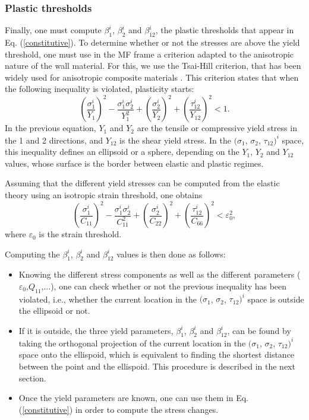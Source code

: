 \documentclass[]{article}
\begin{document}
\subsubsection{Plastic thresholds}
Finally, one must compute $\beta_1^i$, $\beta_2^i$ and $\beta_{12}^i$, the plastic thresholds that appear in Eq. (\ref{constitutive}).
To determine whether or not the stresses are above the yield threshold, one must use in the MF frame a criterion adapted to the anisotropic nature of the wall material. For this, we use the Tsai-Hill criterion, that has been widely used for anisotropic composite materials \citep{tsai65, fuc06, mor15}. This criterion states that when the following inequality is violated, plasticity starts:
\begin{equation}\label{tsai_hill}
	\left(\frac{\sigma_1^i}{Y_1}\right)^2 - \frac{\sigma_1^i \sigma_2^i}{Y_1^2} + \left(\frac{\sigma_2^i}{Y_2}\right)^2 + \left(\frac{\tau_{12}^i}{Y_{12}}\right)^2 <1.
\end{equation}
In the previous equation, $Y_1$ and $Y_2$ are the tensile or compressive yield stress in the 1 and 2 directions, and $Y_{12}$ is the shear yield stress. In the $(\sigma_1$, $\sigma_2$, $\tau_{12})^i$ space, this inequality defines an ellipsoid or a sphere, depending on the $Y_1$, $Y_2$ and $Y_{12}$ values, whose surface is the border between elastic and plastic regimes. 

Assuming that the different yield stresses can be computed from the elastic theory using an isotropic strain threshold, one obtains
\begin{equation}
	\left(\frac{\sigma_1^i}{C_{11}}\right)^2 - \frac{\sigma_1^i \sigma_2^i}{C_{11}^2} + \left(\frac{\sigma_2^i}{C_{22}}\right)^2 + \left(\frac{\tau_{12}^i}{C_{66}}\right)^2 <\varepsilon_0^2,
\end{equation}
where $\varepsilon_0$ is the strain threshold. 

Computing the $\beta_1^i$, $\beta_2^i$ and $\beta_{12}^i$ values is then done as follows:
\begin{itemize}
	\item Knowing the different stress components as well as the different parameters ($\varepsilon_0$,$Q_{11}$,...), one can check whether or not the previous inequality has been violated, i.e., whether the current location in the $(\sigma_1$, $\sigma_2$, $\tau_{12})^i$ space is outside the ellipsoid or not.
	\item If it is outside, the three yield parameters, $\beta_1^i$, $\beta_2^i$ and $\beta_{12}^i$, can be found by taking the orthogonal  projection of the current location in the $(\sigma_1$, $\sigma_2$, $\tau_{12})^i$ space onto the ellispoid, which is equivalent to finding the shortest distance between the point and the ellispoid. This procedure is described in the next section.
	\item Once the yield parameters are known, one can use them in Eq. (\ref{constitutive}) in order to compute the stress changes.
\end{itemize} 
\end{document}

